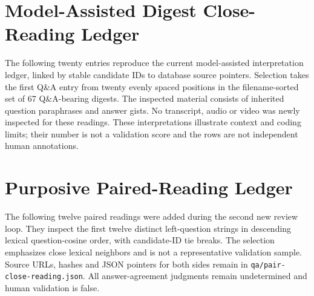 \section{Model-Assisted Digest Close-Reading Ledger}
The following twenty entries reproduce the current model-assisted interpretation ledger, linked by stable candidate IDs to database source pointers. Selection takes the first Q\&A entry from twenty evenly spaced positions in the filename-sorted set of 67 Q\&A-bearing digests. The inspected material consists of inherited question paraphrases and answer gists. No transcript, audio or video was newly inspected for these readings. These interpretations illustrate context and coding limits; their number is not a validation score and the rows are not independent human annotations.


\section{Purposive Paired-Reading Ledger}
The following twelve paired readings were added during the second new review loop. They inspect the first twelve distinct left-question strings in descending lexical question-cosine order, with candidate-ID tie breaks. The selection emphasizes close lexical neighbors and is not a representative validation sample. Source URLs, hashes and JSON pointers for both sides remain in \texttt{qa/pair-close-reading.json}. All answer-agreement judgments remain undetermined and human validation is false.

